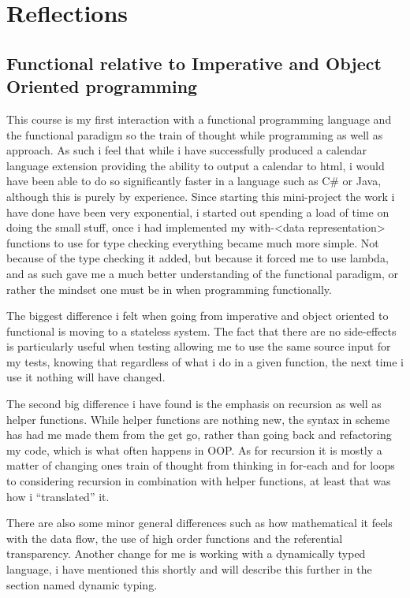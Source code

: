 \documentclass[11pt,a4paper,article,oneside]{memoir}
\begin{document}
\chapter{Reflections}
\section{Functional relative to Imperative and Object Oriented programming}
This course is my first interaction with a functional programming language and the functional paradigm so the train of thought while programming as well as approach.
As such i feel that while i have successfully produced a calendar language extension providing the ability to output a calendar to html, i would have been able to do so significantly faster in a language such as C# or Java, although this is purely by experience.
Since starting this mini-project the work i have done have been very exponential, i started out spending a load of time on doing the small stuff, once i had implemented my with-<data representation> functions to use for type checking everything became much more simple.
Not because of the type checking it added, but because it forced me to use lambda, and as such gave me a much better understanding of the functional paradigm, or rather the mindset one must be in when programming functionally.

\bigskip \noindent
The biggest difference i felt when going from imperative and object oriented to functional is moving to a stateless system.
The fact that there are no side-effects is particularly useful when testing allowing me to use the same source input for my tests, knowing that regardless of what i do in a given function, the next time i use it nothing will have changed.

The second big difference i have found is the emphasis on recursion as well as helper functions.
While helper functions are nothing new, the syntax in scheme has had me made them from the get go, rather than going back and refactoring my code, which is what often happens in OOP.
As for recursion it is mostly a matter of changing ones train of thought from thinking in for-each and for loops to considering recursion in combination with helper functions, at least that was how i ``translated'' it.

There are also some minor general differences such as how mathematical it feels with the data flow, the use of high order functions and the referential transparency.
Another change for me is working with a dynamically typed language, i have mentioned this shortly and will describe this further in the section named dynamic typing.
\end{document}
